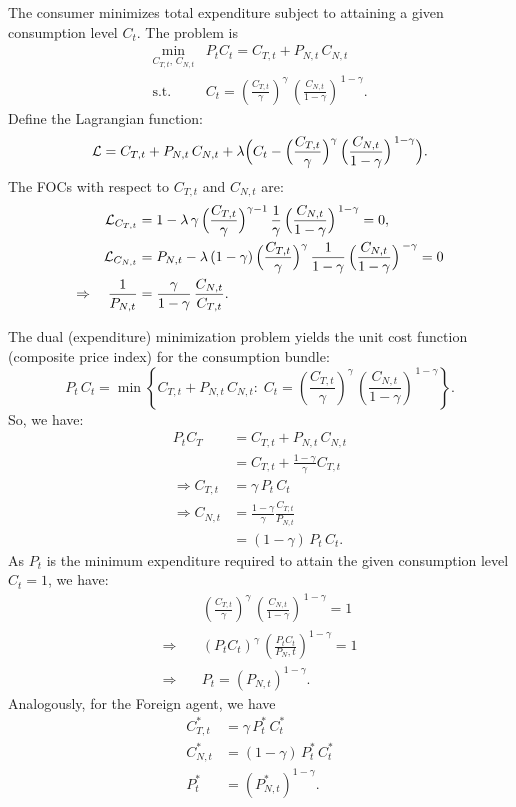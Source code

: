 \documentclass[a4paper,12pt]{article} %
\theoremstyle{nonitalic}
\begin{document}
The consumer minimizes total expenditure subject to attaining a given consumption level $C_t$. The problem is
\begin{align*}
    \min_{C_{T,t},\,C_{N,t}} & P_t C_t = C_{T,t} + P_{N,t}\,C_{N,t} \\
    \text{s.t.} \quad &C_t = \left(\frac{C_{T,t}}{\gamma } \right)^{\gamma}\,\left(\frac{C_{N,t}}{1 - \gamma} \right)^{\,1-\gamma}.
\end{align*}
Define the Lagrangian function:
\[
\mathcal{L} = C_{T,t} + P_{N,t}\,C_{N,t} + \lambda \Bigl(C_t - \Bigl(\frac{C_{T,t}}{\gamma } \Bigr)^{\gamma}\,\Bigl(\frac{C_{N,t}}{1 - \gamma} \Bigr)^{\,1-\gamma}\Bigr).
\]
The FOCs with respect to $C_{T,t}$ and $C_{N,t}$ are:
\begin{align*}
    \mathcal{L}_{C_{T,t}} & = 1 - \lambda\,\gamma\,\Bigl(\frac{C_{T,t}}{\gamma } \Bigr)^{\gamma-1}\,\frac{1}{\gamma}\,\Bigl(\frac{C_{N,t}}{1 - \gamma} \Bigr)^{\,1-\gamma} = 0, \\
    \mathcal{L}_{C_{N,t}} & = P_{N,t} - \lambda\,(1-\gamma)\,\Bigl(\frac{C_{T,t}}{\gamma } \Bigr)^{\gamma}\,\frac{1}{1-\gamma}\,\Bigl(\frac{C_{N,t}}{1 - \gamma} \Bigr)^{\,-\gamma} = 0 \\
    \Rightarrow \quad \frac{1}{P_{N,t}} & = \frac{\gamma}{1-\gamma}\,\frac{C_{N,t}}{C_{T,t}}.
\end{align*}

The dual (expenditure) minimization problem yields the unit cost function (composite price index) for the consumption bundle:
\[
P_t\,C_t = \min \left\{ C_{T,t} + P_{N,t}\,C_{N,t} : \; C_t = \left(\frac{C_{T,t}}{\gamma } \right)^{\gamma}\,\left(\frac{C_{N,t}}{1 - \gamma} \right)^{\,1-\gamma} \right\}.
\]
So, we have:
\begin{align*}
    P_t C_T & = C_{T,t} + P_{N,t}\,C_{N,t} \\
    &= C_{T,t} + \frac{1-\gamma}{\gamma} C_{T,t} \\
    \Rightarrow C_{T,t} &= \gamma\,P_t\,C_t \\
    \Rightarrow C_{N,t} &= \frac{1-\gamma}{\gamma} \frac{C_{T,t}}{P_{N,t}}\\
    &= (1-\gamma)\,P_t\,C_t.
\end{align*}
As $P_t$ is the minimum expenditure required to attain the given consumption level $C_t=1$, we have:
\begin{align*}
    & \left(\frac{C_{T,t}}{\gamma } \right)^{\gamma}\,\left(\frac{C_{N,t}}{1 - \gamma} \right)^{\,1-\gamma} = 1 \\
    \Rightarrow \quad & (P_t C_t)^{\gamma}\,\left(\frac{P_t C_t}{P_N,t}\right)^{1-\gamma} = 1 \\
    \Rightarrow \quad & P_t = (P_{N,t})^{1-\gamma}. 
\end{align*}
Analogously, for the Foreign agent, we have 
\begin{align*}
    C^*_{T,t} &= \gamma\,P^*_t\,C^*_t \\
    C^*_{N,t} &= (1-\gamma)\,P^*_t\,C^*_t \\
    P^*_t &= (P^*_{N,t})^{1-\gamma}.
\end{align*}
\end{document}
